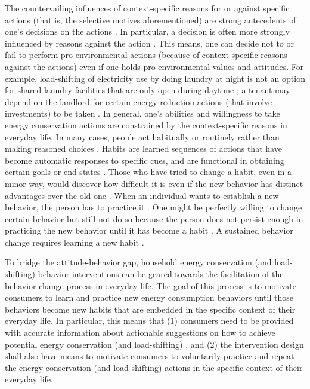The countervailing influences of context-specific reasons for or against specific actions (that is, the selective motives aforementioned) are strong antecedents of one's decisions on the actions  \citep{Claudy2013}. In particular, a decision is often more strongly influenced by reasons against the action  \citep{Claudy2013,Berthou2013}. This means, one can decide not to or fail to perform pro-environmental actions (because of context-specific reasons against the actions) even if one holds pro-environmental values and attitudes. For example, load-shifting of electricity use by doing laundry at night is not an option for shared laundry facilities that are only open during daytime  \citep{Entwistle2015}; a tenant may depend on the landlord for certain energy reduction actions (that involve investments) to be taken  \citep{Dillahunt2010}. In general, one's abilities and willingness to take energy conservation actions are constrained by the context-specific reasons in everyday life. 
In many cases, people act habitually or routinely rather than making reasoned choices  \citep{Steg2009,Berthou2013}. Habits are learned sequences of actions that have become automatic responses to specific cues, and are functional in obtaining certain goals or end-states  \citep{Verplanken1999}. Those who have tried to change a habit, even in a minor way, would discover how difficult it is even if the new behavior has distinct advantages over the old one  \citep{Kollmuss2002}. When an individual wants to establish a new behavior, the person has to practice it  \citep{Kollmuss2002}. One might be perfectly willing to change certain behavior but still not do so because the person does not persist enough in practicing the new behavior until it has become a habit  \citep{Kollmuss2002}. A sustained behavior change requires learning a new habit  \citep{Dillahunt:2009:GEU:1620545.1620583}. 

To bridge the attitude-behavior gap, household energy conservation (and load-shifting) behavior interventions can be geared towards the facilitation of the behavior change process in everyday life. The goal of this process is to motivate consumers to learn and practice new energy consumption behaviors until those behaviors become new habits that are embedded in the specific context of their everyday life. In particular, this means that (1) consumers need to be provided with accurate information about actionable suggestions on how to achieve potential energy conservation (and load-shifting) , and (2) the intervention design shall also have means to motivate consumers to voluntarily practice and repeat the energy conservation (and load-shifting) actions in the specific context of their everyday life.  
